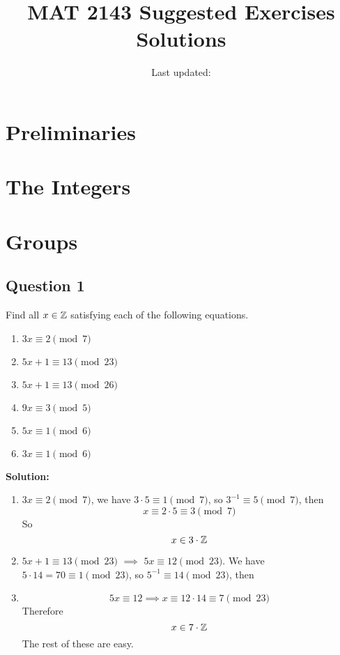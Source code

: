 \documentclass[openany]{report}
\title{MAT 2143 Suggested Exercises Solutions}
\author{Last updated:}
\begin{document}
\maketitle
\tableofcontents

\chapter{Preliminaries}
\chapter{The Integers}
\chapter{Groups}
\section{Question 1}
Find all $x \in \mathbb{Z}$ satisfying each of the following equations. 
\begin{multicols}{2}
    \begin{enumerate}[label=(\alph*)]
        \item $3x \equiv 2 \pmod{7}$
        \item $5x + 1 \equiv 13 \pmod{23}$
        \item $5x + 1 \equiv 13 \pmod{26}$
        \item $9x \equiv 3 \pmod{5}$
        \item $5x \equiv 1 \pmod{6}$
        \item $3x \equiv 1 \pmod{6}$
    \end{enumerate}
\end{multicols}
\textbf{Solution:}
\begin{enumerate}[label=(\alph*)]
    \item $3x \equiv 2 \pmod{7}$, we have $3 \cdot 5 \equiv 1 \pmod{7}$, so $3^{-1} \equiv 5 \pmod{7}$, then 
    \[x \equiv 2 \cdot 5 \equiv 3 \pmod{7}\]
    So 
    $$x \in 3\cdot \mathbb{Z}$$
    \item $5x + 1 \equiv 13 \pmod{23}$ $\implies$ $5x \equiv 12 \pmod{23}$. We have $5 \cdot 14 = 70 \equiv 1 \pmod{23}$, so $5^{-1} \equiv 14 \pmod{23}$, then
    \item \[5x \equiv 12 \implies x \equiv 12 \cdot 14 \equiv 7 \pmod{23}\]
    Therefore 
    \[x \in 7 \cdot \mathbb{Z}\] 
    The rest of these are easy.
\end{enumerate}
\end{document}
